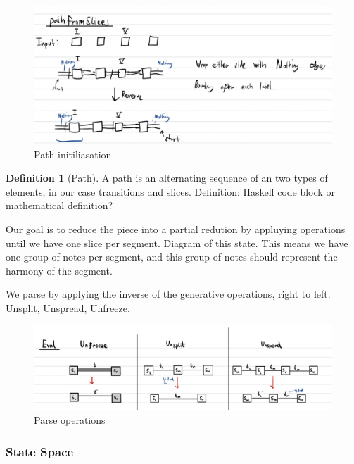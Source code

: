 \documentclass[12pt,a4paper,twoside,openright]{report}
\theoremstyle{definition}
\newtheorem{definition}{Definition}[section]
\begin{document}
\begin{figure}[ht]
  \centering
  \includegraphics[width=\textwidth]{pathFromSlices}
  \caption{Path initiliasation}
  \label{fig:pathInit}
\end{figure}

\begin{definition}[Path]
A path is an alternating sequence of an two types of elements, in our case transitions and slices. Definition: Haskell code block or mathematical definition?
\end{definition}

Our goal is to reduce the piece into a partial redution by appluying operations until we have one slice per segment. Diagram of this state. This means we have one group of notes per segment, and this group of notes should represent the harmony of the segment.

We parse by applying the inverse of the generative operations, right to left. Unsplit, Unspread, Unfreeze.
\par


\begin{figure}[ht]
  \centering
  \includegraphics[width=\textwidth]{parseops}
  \caption{Parse operations}
  \label{fig:parseops}
\end{figure}

\FloatBarrier
\subsubsection{State Space}
\end{document}
